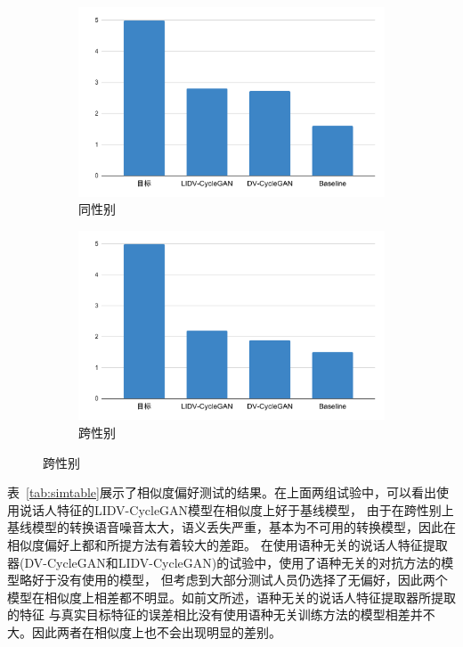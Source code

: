 \begin{figure}[!ht]
    \begin{minipage}[b]{\linewidth}
        \begin{subfigure}[b]{0.48\linewidth}
            \centering
            \includegraphics[width=\linewidth,trim=0 0 0 0,clip]{figure/5_mosintra.pdf}
            \caption{同性别}
        \end{subfigure}        
        \begin{subfigure}[b]{0.48\linewidth}
            \centering
            \includegraphics[width=\linewidth,trim=0 0 0 0,clip]{figure/5_mosinter.pdf}
            \caption{跨性别}
        \end{subfigure}   
    \end{minipage}
    \label{fig:mos2}
\end{figure}

表~\ref{tab:simtable}展示了相似度偏好测试的结果。在上面两组试验中，可以看出使用说话人特征的LIDV-CycleGAN模型在相似度上好于基线模型，
由于在跨性别上基线模型的转换语音噪音太大，语义丢失严重，基本为不可用的转换模型，因此在相似度偏好上都和所提方法有着较大的差距。
在使用语种无关的说话人特征提取器(DV-CycleGAN和LIDV-CycleGAN)的试验中，使用了语种无关的对抗方法的模型略好于没有使用的模型，
但考虑到大部分测试人员仍选择了无偏好，因此两个模型在相似度上相差都不明显。如前文所述，语种无关的说话人特征提取器所提取的特征
与真实目标特征的误差相比没有使用语种无关训练方法的模型相差并不大。因此两者在相似度上也不会出现明显的差别。

